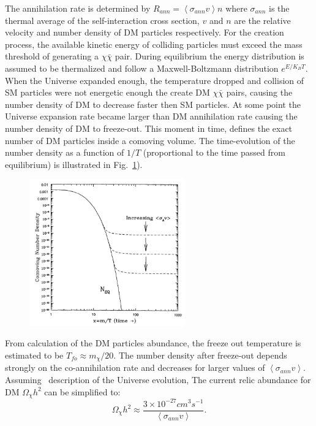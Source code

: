 The annihilation rate is determined by $R_{ann} = \left<\sigma_{ann}v \right>n$ where $\sigma_{ann}$ is the thermal average of the self-interaction cross section, $v$ and $n$ are the relative velocity and number density of DM particles respectively. For the creation process, the available kinetic energy of colliding particles must exceed the mass threshold of generating a $\chi\bar{\chi}$ pair. During equilibrium the energy distribution is assumed to be thermalized and follow a Maxwell-Boltzmann distribution $e^{E/K_BT}$. When the Universe expanded enough, the temperature dropped and collision of SM particles were not energetic enough the create DM $\chi\bar{\chi}$ pairs, causing the number density of DM to decrease faster then SM particles. At some point the Universe expansion rate became larger than DM annihilation rate causing the number density of DM to freeze-out. This moment in time, defines the exact number of DM particles inside a comoving volume. The time-evolution of the number density as a function of $1/T$ (proportional to the time passed from equilibrium) is illustrated in Fig.~\ref{fig:WIMP_Miracle}).

\begin{figure}[]
	\centering
	\includegraphics[width=0.6\textwidth]{figs/WIMP_Miracle.jpg}
	\label{fig:WIMP_Miracle}
\end{figure}  

From calculation of the DM particles abundance, the freeze out temperature is estimated to be $T_{fo} \approx m_{\chi} / 20$. The number density after freeze-out depends strongly on the co-annihilation rate and decreases for larger values of $\left<\sigma_{ann}v\right>$. Assuming \cdm\ description of the Universe evolution, The current relic abundance for DM $\Omega_{\chi} h^2$ can be simplified to:
\begin{equation}
\label{eq:wimp}
\Omega_\chi h^2 \approx \frac{3\times10^{-27}cm^3s^{-1}}{\left<\sigma_{ann}v\right>}.
\end{equation}   

